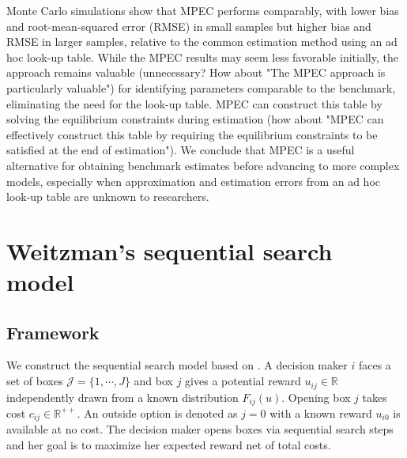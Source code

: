 \documentclass[12pt]{article}
\begin{document}
Monte Carlo simulations show that MPEC performs comparably, with lower bias and root-mean-squared error (RMSE) in small samples but higher bias and RMSE in larger samples, relative to the common estimation method using an ad hoc look-up table. {\color{blue}While the MPEC results may seem less favorable initially, the approach remains valuable (unnecessary? How about "The MPEC approach is particularly valuable")} for identifying parameters comparable to the benchmark, eliminating the need for the look-up table. {\color{blue}MPEC can construct this table by solving the equilibrium constraints during estimation (how about "MPEC can effectively construct this table by requiring the equilibrium constraints to be satisfied at the end of estimation")}. We conclude that MPEC is a useful alternative for obtaining benchmark estimates before advancing to more complex models, especially when approximation and estimation errors from an ad hoc look-up table are unknown to researchers.




\section{Weitzman's sequential search model}

\subsection{Framework}
We construct the sequential search model based on \cite{weitzman1979optimal}.
A decision maker $i$ faces {\color{blue}a set of boxes $\mathcal{J}=\{1,\cdots,J\}$} and box $j$ gives a potential reward $u_{ij}\in \mathbb{R}$ independently drawn from a known
distribution $F_{ij}(u)$.
Opening box $j$ takes cost $c_{ij}\in \mathbb{R}^{++}$. 
An outside option is denoted as $j = 0$ with a known reward $u_{i0}$ is available at no cost.
The decision maker
opens boxes via sequential search steps and her goal is to maximize her expected reward net of total costs.
\end{document}
